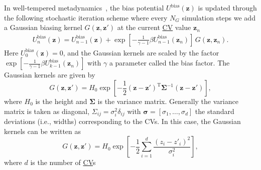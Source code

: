 \documentclass[9pt,review]{livecoms}
\newcommand{\vz}{\mathbf{z}}
\begin{document}
In well-tempered metadynamics~\cite{Barducci-PRL-2008}, the bias potential $U^{\mathrm{bias}}(\vz)$ is updated through the following stochastic iteration scheme where every $N_G$ simulation steps we add a Gaussian biasing kernel $G(\vz,\vz')$ at the current \hyperlink{ref:CV} {CV} value $\vz_n$
\begin{align}
\label{wtmetad_update}
U^{\mathrm{bias}}_{n}(\vz) = U^{\mathrm{bias}}_{n-1}(\vz) +
\exp \left[-\frac{1}{\gamma-1} \beta  U^{\mathrm{bias}}_{n-1}(\vz_n)   \right]
\,
G(\vz,\vz_{n})
.
\end{align}
Here $U^{\mathrm{bias}}_{0}(\vz)=0$, and the Gaussian kernels are scaled by the factor $\exp \left[-\frac{1}{\gamma-1}
\beta U^{\mathrm{bias}}_{k-1}(\vz_n)   \right]$ with $\gamma$ a parameter called the bias factor. The Gaussian kernels are given by
\begin{equation}
G(\vz,\vz')=H_{0}\exp \left[-\frac{1}{2} \left(\vz-\vz'\right)^{\mathrm{T}}\boldsymbol{\Sigma}^{-1}\left(\vz-\vz'\right)\right],
\end{equation}
where $H_{0}$ is the height and $\boldsymbol{\Sigma}$ is the variance matrix. Generally the variance matrix is taken as diagonal, $\Sigma_{ij}= \sigma_{i}^{2} \delta_{ij}$ with $\boldsymbol{\sigma}=[\sigma_1,\ldots,\sigma_d]$ the standard deviations (i.e., widths) corresponding to the CVs. In this case, the Gaussian kernels can be written as
\begin{equation}
G(\vz,\vz')=H_{0} \exp \left[-\frac{1}{2}\sum^{d}_{i=1} \frac{(z_i-z'_{i})^2}{\sigma^2_i} \right],
\end{equation}
where $d$ is the number of \hyperlink{ref:CV} {CV}s
\end{document}
